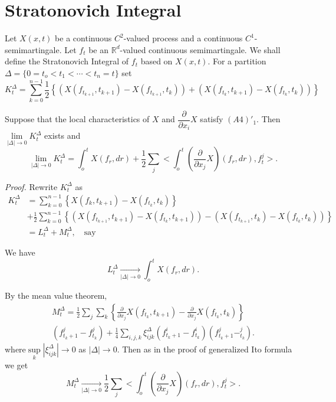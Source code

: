 \section*{Stratonovich Integral}\pageoriginale

Let $X(x, t)$ be a continuous $C^2$-valued process and a continuous
$C^1$-semimartingale. Let $f_t$ be an $\mathbb{R}^d$-valued continuous
semimartingale. We shall define the Stratonovich Integral of $f_t$
based on $X(x, t)$. For a partition $\Delta = \{0 =t_o < t_1 < \cdots <
t_n = t\}$ set
\begin{equation*}
  K_t^{\Delta} = \sum_{k=0}^{n-1} \frac{1}{2} \left\{ (X(f_{t_{k+1}},
  t_{k+1}) - X(f_{t_{k+1}}, t_k)) + (X(f_{t_k}, t_{k+1})- X(f_{t_k},
  t_k)) \right\}\tag{2.7.2}\label{c2:eq2.7.2} 
\end{equation*}

\setcounter{Lemma}{2}
\begin{Lemma}\label{c2:lem2.7.3}%
  Suppose that the local characteristics of $X$ and
  $\dfrac{\partial}{\partial x_i}X$ satisfy $(A4)'_1$. Then $\lim
  \limits_{|\Delta|\to 0} K_t^{\Delta}$ exists and  
  \begin{equation*}
    \lim_{|\Delta|\to 0} K_t^{\Delta} = \int_o^t X(f_r, dr) +
    \frac{1}{2} \sum_j <\int_o^t \left( \frac{\partial}{\partial
      x_j}X\right)(f_r, dr), f^j_t>. \tag{2.7.3}\label{c2:eq2.7.3} 
  \end{equation*}
\end{Lemma}

\noindent \textit{Proof.}%
Rewrite $K_t^{\Delta}$ as 
\begin{align*}
  K_t^{\Delta} & = \sum_{k=0}^{n-1} \left\{ X(f_k, t_{k+1})- X(f_{t_k}, t_k)
  \right\}\\ 
  & + \frac{1}{2} \sum_{k=0}^{n-1} \left\{ ( X(f_{t_{k+1}}, t_{k+1})-
  X(f_{t_k}, t_{k+1})) -  (X(f_{t_{k+1}}, t_{k})- X(f_{t_k}, t_k))\right\}
  \\ 
  & = L_t^{\Delta} + M_t^{\Delta}, \quad \text{say}\tag*{$\Box$}
\end{align*}

We have 
$$
L_t^{\Delta} \xrightarrow[|\Delta| \rightarrow 0]{} \int_o^t X(f_r, dr). 
$$

By the mean value theorem,
\begin{multline*}
  M_t^{\Delta} = \frac{1}{2} \sum_j \sum_k  \left\{ \frac{\partial}{\partial
    x_j} X(f_{t_k}, t_{k+1}) - \frac{\partial}{\partial x_j} X(f_{t_k},
  t_k) \right\}\\ 
  \left(f^j_{t_k+1} - f^j _{t_k}\right) + \frac {1}{4} \sum_{i,j,k}
  \xi_{ijk}^{\Delta} \left(f^i_{t_k+1} - f^i _{t_k}\right) \left(f^j_{t_k+1} - ^j
  _{t_k}\right). 
\end{multline*}
where\pageoriginale $\sup \limits_k |\xi_{ijk}^{\Delta}| \to 0$ as $|\Delta| \to
0$. Then as in the proof of generalized Ito formula we get 
$$
M_t^{\Delta} \xrightarrow[|\Delta| \rightarrow 0]{} \frac{1}{2}\sum_j
<\int_o^t   \left(\frac{\partial}{\partial x_j} X\right)(f_r, dr), f_t^j>.  
$$

